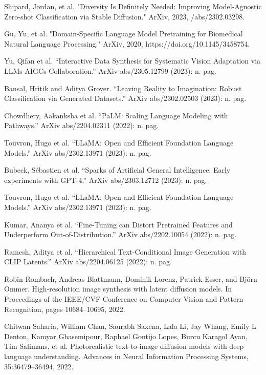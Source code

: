 \documentclass[preprint,12pt,authoryear]{elsarticle}
\begin{document}
\begin{thebibliography}{00}
Shipard, Jordan, et al. "Diversity Is Definitely Needed: Improving Model-Agnostic Zero-shot Classification via Stable Diffusion." ArXiv, 2023, /abs/2302.03298.

Gu, Yu, et al. "Domain-Specific Language Model Pretraining for Biomedical Natural Language Processing." ArXiv, 2020, https://doi.org/10.1145/3458754.

Yu, Qifan et al. “Interactive Data Synthesis for Systematic Vision Adaptation via LLMs-AIGCs Collaboration.” ArXiv abs/2305.12799 (2023): n. pag.

Bansal, Hritik and Aditya Grover. “Leaving Reality to Imagination: Robust Classification via Generated Datasets.” ArXiv abs/2302.02503 (2023): n. pag.

Chowdhery, Aakanksha et al. “PaLM: Scaling Language Modeling with Pathways.” ArXiv abs/2204.02311 (2022): n. pag.

Touvron, Hugo et al. “LLaMA: Open and Efficient Foundation Language Models.” ArXiv abs/2302.13971 (2023): n. pag.

Bubeck, Sébastien et al. “Sparks of Artificial General Intelligence: Early experiments with GPT-4.” ArXiv abs/2303.12712 (2023): n. pag.

Touvron, Hugo et al. “LLaMA: Open and Efficient Foundation Language Models.” ArXiv abs/2302.13971 (2023): n. pag.

Kumar, Ananya et al. “Fine-Tuning can Distort Pretrained Features and Underperform Out-of-Distribution.” ArXiv abs/2202.10054 (2022): n. pag.

Ramesh, Aditya et al. “Hierarchical Text-Conditional Image Generation with CLIP Latents.” ArXiv abs/2204.06125 (2022): n. pag.

Robin Rombach, Andreas Blattmann, Dominik Lorenz,
Patrick Esser, and Björn Ommer. High-resolution image
synthesis with latent diffusion models. In Proceedings of
the IEEE/CVF Conference on Computer Vision and Pattern
Recognition, pages 10684–10695, 2022.

Chitwan Saharia, William Chan, Saurabh Saxena, Lala
Li, Jay Whang, Emily L Denton, Kamyar Ghasemipour, Raphael Gontijo Lopes, Burcu Karagol Ayan, Tim Salimans, et al. Photorealistic text-to-image diffusion models with deep language understanding. Advances in Neural Information Processing Systems, 35:36479–36494, 2022.


\end{thebibliography}
\end{document}
